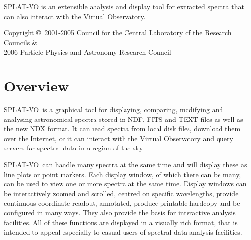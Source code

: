 \documentclass[twoside,11pt]{article}
\newcommand{\stardocinitials}  {SUN}
\newcommand{\stardoccopyright}
{Copyright \copyright\ 2001-2005 Council for the Central Laboratory of the
Research Councils \& \\
2006 Particle Physics and Astronomy Research Council}
\newcommand{\stardocnumber}    {243.12}
\newcommand{\stardocabstract}  {
\textsf{SPLAT-VO} is an extensible analysis and display tool for extracted
spectra that can also interact with the Virtual Observatory.
}
\newcommand{\stardocname}{\stardocinitials /\stardocnumber}
\newenvironment{latexonly}{}{}
\newcommand{\xlabel}[1]{}
\renewcommand{\_}{\texttt{\symbol{95}}}
\newcommand{\SPLAT}{\textsf{SPLAT-VO}}
\renewcommand{\thepage}{\roman{page}}
\begin{document}
\begin{center}
\stardocabstract
\end{center}

\begin{latexonly}
\newpage
\vspace*{\fill}
\stardoccopyright
\end{latexonly}

\newpage
\begin{latexonly}
  \setlength{\parskip}{0mm}
  \tableofcontents
  \setlength{\parskip}{\medskipamount}
  \markboth{\stardocname}{\stardocname}
\end{latexonly}

\cleardoublepage
\renewcommand{\thepage}{\arabic{page}}
\setcounter{page}{1}


\section{Overview\xlabel{overview}}

\SPLAT\ is a graphical tool for displaying, comparing, modifying and
analysing astronomical spectra stored in NDF, FITS and TEXT files as well as
the new NDX format. It can read spectra from local disk files, download them
over the Internet, or it can interact with the Virtual Observatory and query
servers for spectral data in a region of the sky.

\SPLAT\ can handle many spectra at the same time and will display these as
line plots or point markers.
Each display window, of which there can be many, can be used to
view one or more spectra at the same time.
Display windows can be interactively zoomed and scrolled, centred on
specific wavelengths, provide continuous coordinate readout, annotated,
produce printable hardcopy and be configured in many ways.
They also provide the basis for interactive analysis facilities.
All of these functions are displayed in a visually rich format, that
is intended to appeal especially to casual users of spectral data
analysis facilities.
\end{document}
